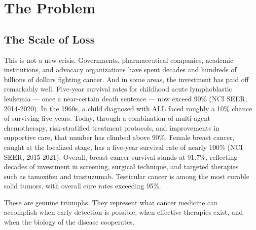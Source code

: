 \documentclass[11pt,twoside,openright]{report}
\begin{document}
\chapter{The Problem}


\section{The Scale of Loss}


This is not a new crisis. Governments, pharmaceutical companies, academic institutions, and advocacy organizations have spent decades and hundreds of billions of dollars fighting cancer. And in some areas, the investment has paid off remarkably well. Five-year survival rates for childhood acute lymphoblastic leukemia --- once a near-certain death sentence --- now exceed 90\% (NCI SEER, 2014-2020). In the 1960s, a child diagnosed with ALL faced roughly a 10\% chance of surviving five years. Today, through a combination of multi-agent chemotherapy, risk-stratified treatment protocols, and improvements in supportive care, that number has climbed above 90\%. Female breast cancer, caught at the localized stage, has a five-year survival rate of nearly 100\% (NCI SEER, 2015-2021). Overall, breast cancer survival stands at 91.7\%, reflecting decades of investment in screening, surgical technique, and targeted therapies such as tamoxifen and trastuzumab. Testicular cancer is among the most curable solid tumors, with overall cure rates exceeding 95\%.

These are genuine triumphs. They represent what cancer medicine can accomplish when early detection is possible, when effective therapies exist, and when the biology of the disease cooperates.
\end{document}
